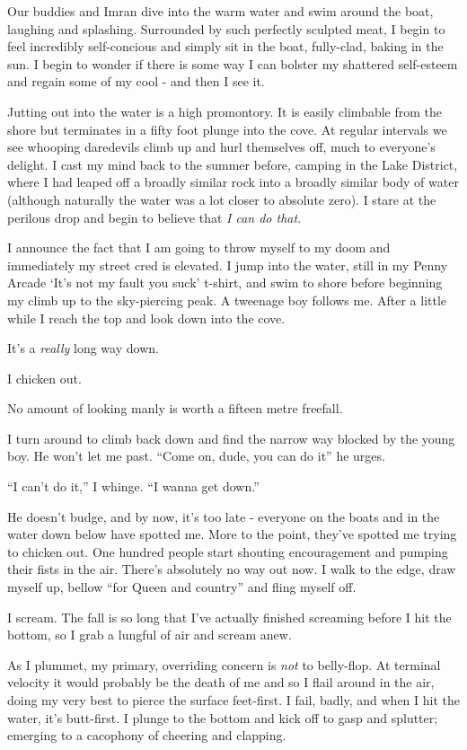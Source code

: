 \documentclass[a5paper,titlepage,draft]{book}
\begin{document}
Our buddies and Imran dive into the warm water and swim around the boat, laughing and splashing.  Surrounded by such perfectly sculpted meat, I begin to feel incredibly self-concious and simply sit in the boat, fully-clad, baking in the sun.  I begin to wonder if there is some way I can bolster my shattered self-esteem and regain some of my cool - and then I see it.

Jutting out into the water is a high promontory.  It is easily climbable from the shore but terminates in a fifty foot plunge into the cove.  At regular intervals we see whooping daredevils climb up and hurl themselves off, much to everyone's delight.  I cast my mind back to the summer before, camping in the Lake District, where I had leaped off a broadly similar rock into a broadly similar body of water (although naturally the water was a lot closer to absolute zero).  I stare at the perilous drop and begin to believe that \emph{I can do that}.

I announce the fact that I am going to throw myself to my doom and immediately my street cred is elevated.  I jump into the water, still in my Penny Arcade `It's not my fault you suck' t-shirt, and swim to shore before beginning my climb up to the sky-piercing peak.  A tweenage boy follows me.  After a little while I reach the top and look down into the cove.

It's a \emph{really} long way down.

I chicken out.

No amount of looking manly is worth a fifteen metre freefall.

I turn around to climb back down and find the narrow way blocked by the young boy.  He won't let me past. ``Come on, dude, you can do it'' he urges.

``I can't do it,'' I whinge.  ``I wanna get down.''

He doesn't budge, and by now, it's too late - everyone on the boats and in the water down below have spotted me.  More to the point, they've spotted me trying to chicken out.  One hundred people start shouting encouragement and pumping their fists in the air.  There's absolutely no way out now.  I walk to the edge, draw myself up, bellow ``for Queen and country'' and fling myself off.

I scream.  The fall is so long that I've actually finished screaming before I hit the bottom, so I grab a lungful of air and scream anew.

As I plummet, my primary, overriding concern is \emph{not} to belly-flop.  At terminal velocity it would probably be the death of me and so I flail around in the air, doing my very best to pierce the surface feet-first.  I fail, badly, and when I hit the water, it's butt-first.  I  plunge to the bottom and kick off to gasp and splutter; emerging to a cacophony of cheering and clapping.
\end{document}
